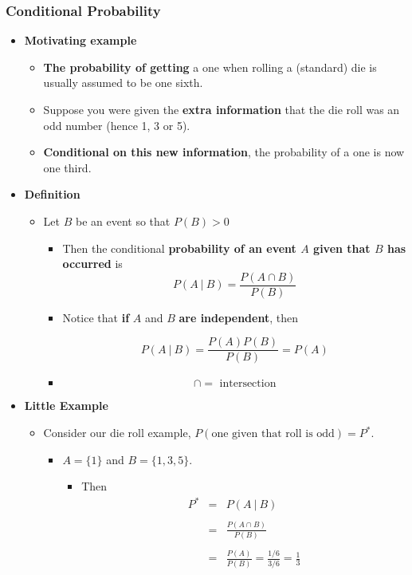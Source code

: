 \documentclass[10pt,article]{article}
\begin{document}
\subsubsection{Conditional Probability}
\label{sec:orgc97f87a}
\begin{itemize}
\item \textbf{Motivating example}
\label{sec:org148bcf1}
\begin{itemize}
\item \textbf{The probability of getting} a one when rolling a (standard) die is usually assumed to be one sixth.
\item Suppose you were given the \textbf{extra information} that the {\color{green}die roll was an odd number} (hence 1, 3 or 5).
\item \textbf{Conditional on this new information}, the probability of a one is {\color{green}now one third}.
\end{itemize}
\item \textbf{Definition}
\label{sec:org1c7440b}
\begin{itemize}
\item Let \(B\) be an event so that \(P(B) > 0\)
\begin{itemize}
\item Then the conditional \textbf{probability of an event \(A\) given that \(B\) has occurred} is
$$  P(A ~|~ B) = \frac{P(A \cap B)}{P(B)}$$
\item Notice that \textbf{if} {\color{green}\(A\) and \(B\)} \textbf{are independent}, then

$$  P(A ~|~ B) = \frac{P(A) P(B)}{P(B)} = P(A)$$
\item $$\cap =\mbox{ intersection}$$
\end{itemize}
\end{itemize}
\item \textbf{Little Example}
\label{sec:org9a2ad25}
\begin{itemize}
\item Consider our die roll example, \(P(\mbox{one given that roll is odd})=P^*\).
\begin{itemize}
\item \(A = \{1\}\) and \(B = \{1, 3, 5\}\).
\begin{itemize}
\item Then
\begin{eqnarray*} P^* & = & P(A ~|~ B) \\ \\
& = & \frac{P(A \cap B)}{P(B)} \\ \\
& = & \frac{P(A)}{P(B)} = \frac{1/6}{3/6} = \frac{1}{3}
\end{eqnarray*}
\end{itemize}
\end{itemize}
\end{itemize}
\end{itemize}
\end{document}
